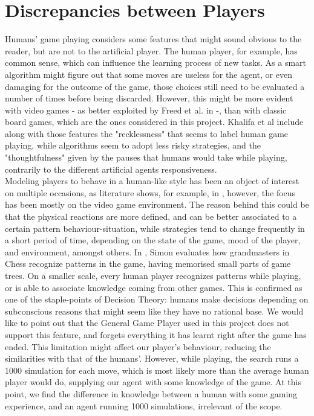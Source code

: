 \section{Discrepancies between Players}
Humans' game playing considers some features that might sound obvious to the reader, but are not to the artificial player. The human player, for example, has common sense, which can influence the learning process of new tasks\cite{hosu2016playing}. As a smart algorithm might figure out that some moves are useless for the agent, or even damaging for the outcome of the game, those choices still need to be evaluated a number of times before being discarded. However, this might be more evident with video games - as better exploited by Freed et al. in \cite{freed2000towards} -, than with classic board games, which are the ones considered in this project. Khalifa et al include along with those features the "recklessness" that seems to label human game playing, while algorithms seem to adopt less risky strategies, and the "thoughtfulness" given by the pauses that humans would take while playing, contrarily to the different artificial agents responsiveness\cite{khalifamodifying}. \\
Modeling players to behave in a human-like style has been an object of interest on multiple occasions, as literature shows, for example, in \cite{martinez2016creating,isaksen2015exploring,thurau2004learning}, however, the focus has been mostly on the video game environment. The reason behind this could be that the physical reactions are more defined, and can be better associated to a certain pattern behaviour-situation, while strategies tend to change frequently in a short period of time, depending on the state of the game, mood of the player, and environment, amongst others\cite{isaksen2015exploring}. In \cite{simon1992game}, Simon evaluates how grandmasters in Chess recognize patterns in the game, having memorised small parts of game trees. On a smaller scale, every human player recognizes patterns while playing, or is able to associate knowledge coming from other games. This is confirmed as one of the staple-points of Decision Theory: humans make decisions depending on subconscious reasons that might seem like they have no rational base\cite{kahneman2011thinking}.  We would like to point out that the General Game Player used in this project does not support this feature, and forgets everything it has learnt right after the game has ended. This limitation might affect our player's behaviour, reducing the similarities with that of the humans'. However, while playing, the search runs a 1000 simulation for each move, which is most likely more than the average human player would do, supplying our agent with some knowledge of the game. At this point, we find the difference in knowledge between a human with some gaming experience, and an agent running 1000 simulations, irrelevant of the scope. 
